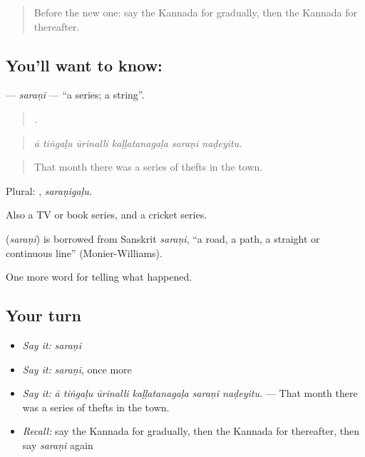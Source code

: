 \label{lesson:KA-C368-sarani}



\begin{quote}
Before the new one: say the Kannada for gradually, then the Kannada for thereafter.
\end{quote}

\subsection*{You'll want to know: }
\textbf{} — \emph{saraṇi} — \textquotedblleft{}a series; a string\textquotedblright{}.

\begin{quote}
     .
\end{quote}

\begin{quote}
\emph{ā tiṅgaḷu ūrinalli kaḷḷatanagaḷa saraṇi naḍeyitu.}
\end{quote}

\begin{quote}
That month there was a series of thefts in the town.
\end{quote}

Plural: , \emph{saraṇigaḷu}.

Also a TV or book series, and a cricket series.

\begin{cousinweb}
\textbf{} (\emph{saraṇi}) is borrowed from Sanskrit \emph{saraṇi}, \textquotedblleft{}a road, a path, a straight or continuous line\textquotedblright{} (Monier-Williams).
\end{cousinweb}

\begin{grammarlens}[title={What you've built}]
One more word for telling what happened.
\end{grammarlens}

\subsection*{Your turn}
\begin{itemize}
\raggedright
  \item \emph{Say it:} \emph{saraṇi}
  \item \emph{Say it:} \emph{saraṇi}, once more
  \item \emph{Say it:} \emph{ā tiṅgaḷu ūrinalli kaḷḷatanagaḷa saraṇi naḍeyitu.} — That month there was a series of thefts in the town.
  \item \emph{Recall:} say the Kannada for gradually, then the Kannada for thereafter, then say \emph{saraṇi} again
\end{itemize}

